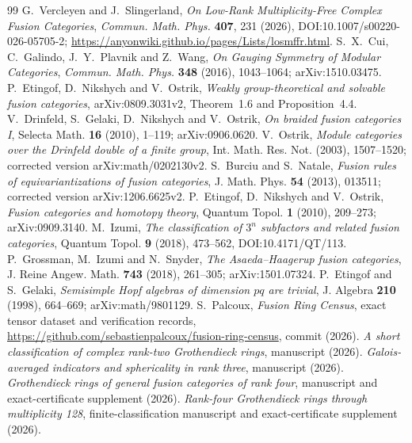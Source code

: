 \documentclass[11pt,reqno]{amsart}
\theoremstyle{definition}
\theoremstyle{remark}
\newcommand{\sha}[1]{\texttt{\detokenize{#1}}}
\begin{document}
\begin{thebibliography}{99}
 G.~Vercleyen and J.~Slingerland,
\emph{On Low-Rank Multiplicity-Free Complex Fusion Categories},
\emph{Commun. Math. Phys.} \textbf{407}, 231 (2026),
DOI:10.1007/s00220-026-05705-2;
\url{https://anyonwiki.github.io/pages/Lists/losmffr.html}.
 S.~X.~Cui, C.~Galindo, J.~Y.~Plavnik and Z.~Wang,
\emph{On Gauging Symmetry of Modular Categories},
\emph{Commun. Math. Phys.} \textbf{348} (2016), 1043--1064;
arXiv:1510.03475.
 P.~Etingof, D.~Nikshych and V.~Ostrik, \emph{Weakly group-theoretical and solvable fusion categories}, arXiv:0809.3031v2, Theorem~1.6 and Proposition~4.4.
 V.~Drinfeld, S.~Gelaki, D.~Nikshych and V.~Ostrik, \emph{On braided fusion categories I}, Selecta Math. \textbf{16} (2010), 1--119; arXiv:0906.0620.
 V.~Ostrik, \emph{Module categories over the Drinfeld double of a finite group}, Int. Math. Res. Not. (2003), 1507--1520; corrected version arXiv:math/0202130v2.
 S.~Burciu and S.~Natale, \emph{Fusion rules of equivariantizations of fusion categories}, J. Math. Phys. \textbf{54} (2013), 013511; corrected version arXiv:1206.6625v2.
 P.~Etingof, D.~Nikshych and V.~Ostrik, \emph{Fusion categories and homotopy theory}, Quantum Topol. \textbf{1} (2010), 209--273; arXiv:0909.3140.
 M.~Izumi, \emph{The classification of $3^n$ subfactors and related fusion categories}, Quantum Topol. \textbf{9} (2018), 473--562, DOI:10.4171/QT/113.
 P.~Grossman, M.~Izumi and N.~Snyder, \emph{The Asaeda--Haagerup fusion categories}, J. Reine Angew. Math. \textbf{743} (2018), 261--305; arXiv:1501.07324.
 P.~Etingof and S.~Gelaki, \emph{Semisimple Hopf algebras of dimension $pq$ are trivial}, J. Algebra \textbf{210} (1998), 664--669; arXiv:math/9801129.
 S.~Palcoux, \emph{Fusion Ring Census}, exact tensor dataset and verification records, \url{https://github.com/sebastienpalcoux/fusion-ring-census}, commit \sha{b86eb6dc6eeeafe5fc5f6906d7b074e0322e9726} (2026).
 \emph{A short classification of complex rank-two Grothendieck rings}, manuscript (2026).
 \emph{Galois-averaged indicators and sphericality in rank three}, manuscript (2026).
 \emph{Grothendieck rings of general fusion categories of rank four}, manuscript and exact-certificate supplement (2026).
 \emph{Rank-four Grothendieck rings through multiplicity 128}, finite-classification manuscript and exact-certificate supplement (2026).

\end{thebibliography}
\end{document}
